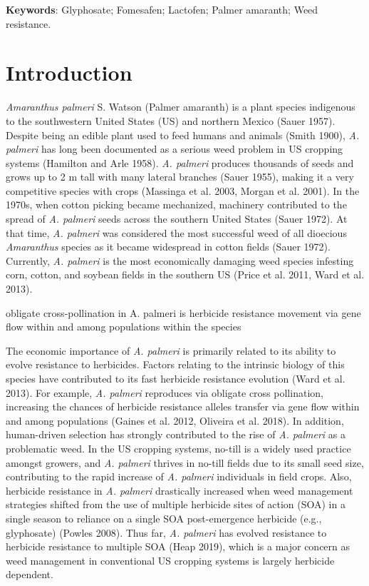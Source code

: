 \documentclass[
  12pt,
  a4paper]{article}
\begin{document}
\vspace{2mm}

\noindent \textbf{Keywords}: Glyphosate; Fomesafen; Lactofen; Palmer
amaranth; Weed resistance.

\linenumbers

\hypertarget{introduction}{%
\section{Introduction}\label{introduction}}

\emph{Amaranthus palmeri} S. Watson (Palmer amaranth) is a plant species
indigenous to the southwestern United States (US) and northern Mexico
(Sauer 1957). Despite being an edible plant used to feed humans and
animals (Smith 1900), \emph{A. palmeri} has long been documented as a
serious weed problem in US cropping systems (Hamilton and Arle 1958).
\emph{A. palmeri} produces thousands of seeds and grows up to 2 m tall
with many lateral branches (Sauer 1955), making it a very competitive
species with crops (Massinga et al. 2003, Morgan et al. 2001). In the
1970s, when cotton picking became mechanized, machinery contributed to
the spread of \emph{A. palmeri} seeds across the southern United States
(Sauer 1972). At that time, \emph{A. palmeri} was considered the most
successful weed of all dioecious \emph{Amaranthus} species as it became
widespread in cotton fields (Sauer 1972). Currently, \emph{A. palmeri}
is the most economically damaging weed species infesting corn, cotton,
and soybean fields in the southern US (Price et al. 2011, Ward et al.
2013).

obligate cross-pollination in A. palmeri is herbicide resistance
movement via gene flow within and among populations within the species

The economic importance of \emph{A. palmeri} is primarily related to its
ability to evolve resistance to herbicides. Factors relating to the
intrinsic biology of this species have contributed to its fast herbicide
resistance evolution (Ward et al. 2013). For example, \emph{A. palmeri}
reproduces via obligate cross pollination, increasing the chances of
herbicide resistance alleles transfer via gene flow within and among
populations (Gaines et al. 2012, Oliveira et al. 2018). In addition,
human-driven selection has strongly contributed to the rise of \emph{A.
palmeri} as a problematic weed. In the US cropping systems, no-till is a
widely used practice amongst growers, and \emph{A. palmeri} thrives in
no-till fields due to its small seed size, contributing to the rapid
increase of \emph{A. palmeri} individuals in field crops. Also,
herbicide resistance in \emph{A. palmeri} drastically increased when
weed management strategies shifted from the use of multiple herbicide
sites of action (SOA) in a single season to reliance on a single SOA
post-emergence herbicide (e.g., glyphosate) (Powles 2008). Thus far,
\emph{A. palmeri} has evolved resistance to herbicide resistance to
multiple SOA (Heap 2019), which is a major concern as weed management in
conventional US cropping systems is largely herbicide dependent.
\end{document}
